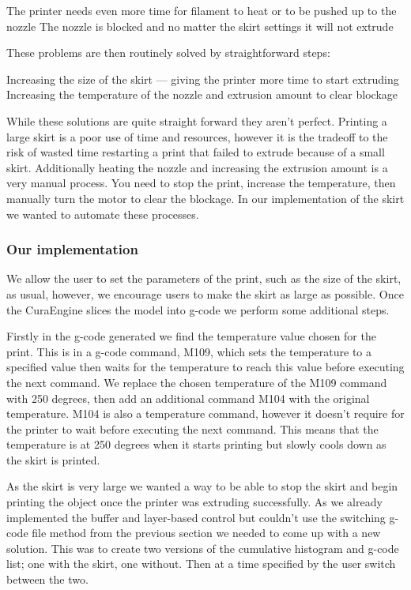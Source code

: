 \documentclass[11pt]{report} %
\begin{document}
The printer needs even more time for filament to heat or to be pushed up to the nozzle
The nozzle is blocked and no matter the skirt settings it will not extrude 

These problems are then routinely solved by straightforward steps:

Increasing the size of the skirt --- giving the printer more time to start extruding
Increasing the temperature of the nozzle and extrusion amount to clear blockage

While these solutions are quite straight forward they aren't perfect. Printing a large skirt is a poor use of time and resources, however it is the tradeoff to the risk of wasted time restarting a print that failed to extrude because of a small skirt. Additionally heating the nozzle and increasing the extrusion amount is a very manual process. You need to stop the print, increase the temperature, then manually turn the motor to clear the blockage. In our implementation of the skirt we wanted to automate these processes.

\subsubsection{Our implementation}
We allow the user to set the parameters of the print, such as the size of the skirt, as usual, however, we encourage users to make the skirt as large as possible. Once the CuraEngine slices the model into g-code we perform some additional steps. 

Firstly in the g-code generated we find the temperature value chosen for the print. This is in a g-code command, M109, which sets the temperature to a specified value then waits for the temperature to reach this value before executing the next command. We replace the chosen temperature of the M109 command with 250 degrees, then add an additional command M104 with the original temperature. M104 is also a temperature command, however it doesn't require for the printer to wait before executing the next command. This means that the temperature is at 250 degrees when it starts printing but slowly cools down as the skirt is printed. 

As the skirt is very large we wanted a way to be able to stop the skirt and begin printing the object once the printer was extruding successfully. As we already implemented the buffer and layer-based control but couldn't use the switching g-code file method from the previous section we needed to come up with a new solution. This was to create two versions of the cumulative histogram and g-code list; one with the skirt, one without. Then at a time specified by the user switch between the two. 
\end{document}
